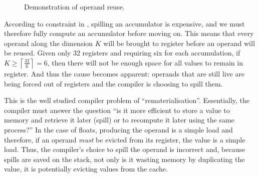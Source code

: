\documentclass[\main/thesis.tex]{subfiles}
\begin{document}
\begin{figure}[t]
  \centering
  \caption{Demonstration of operand reuse.}
  \label{fig:opReuse}
\end{figure}

According to constraint  in , spilling an accumulator is expensive, and we must therefore fully compute an accumulator before moving on.
This means that every operand along the dimension $K$ will be brought to register before an operand will be reused.
Given only 32 registers and requiring six for each accumulation, if $K \geq \left\lceil \frac{32}{6} \right\rceil = 6$, then there will not be enough space for all values to remain in register\footnotemark.
And thus the cause becomes apparent: operands that are still \gls{live} are being forced out of registers and the compiler is choosing to spill them.

This is the well studied compiler problem of ``\gls{rematerialisation}''.
Essentially, the compiler must answer the question ``is it more efficient to store a value to memory and retrieve it later (\gls{spill}) or to recompute it later using the same process?''
In the case of floats, producing the operand is a simple load and therefore, if an operand \emph{must} be evicted from its register,  the value is a simple load.
Thus, the compiler's choice to spill the operand is incorrect and, because spills are saved on the stack, not only is it wasting memory by duplicating the value, it is potentially evicting values from the cache.
\end{document}
